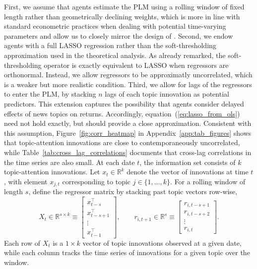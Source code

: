 \documentclass[11pt]{article}
\begin{document}
First, we assume that agents estimate the PLM using a rolling window of fixed length rather than geometrically declining weights, which is more in line with standard econometric practices when dealing with potential time-varying parameters and allow us to closely mirror
the design of \cite{Chinco2019}.
Second, we endow agents with a full LASSO regression rather than the soft-thresholding approximation used in the theoretical analysis.
As already remarked, the soft-thresholding operator is exactly equivalent to LASSO when regressors are orthonormal.
Instead, we allow regressors to be approximatly uncorrelated, which is a weaker but more realistic condition.
Third, we allow for lags of the regressors to enter the PLM, by stacking $n$ lags of each topic innovation as potential predictors.
This extension captures the possibility that agents consider delayed effects of news topics on returns.
Accordingly, equation~(\ref{eq:lasso_from_ols}) need not hold exactly, but should provide a close approximation.
Consistent with this assumption, Figure~\ref{fig:corr_heatmap} in Appendix~\ref{app:tab_figures} shows that topic-attention innovations are close to contemporaneously uncorrelated, while Table~\ref{tab:cross_lag_correlations} documents that cross-lag correlations in the time series are also small.
At each date \(t\), the information set consists of \(k\) topic-attention innovations. Let
\(x_t \in \mathbb{R}^{k}\) denote the vector of innovations at time \(t\), with element
\(x_{j,t}\) corresponding to topic \(j \in \{1,\ldots,k\}\).
For a rolling window of length \(s\), define the regressor matrix by stacking past topic
vectors row-wise,
\begin{equation}
X_t \in \mathbb{R}^{s \times k}
\equiv
\begin{bmatrix}
x_{t-s}^\top \\
x_{t-s+1}^\top \\
\vdots \\
x_{t-1}^\top
\end{bmatrix},
\qquad
r_{i,t+1} \in \mathbb{R}^{s}
\equiv
\begin{bmatrix}
r_{i,t-s+1} \\
r_{i,t-s+2} \\
\vdots \\
r_{i,t}
\end{bmatrix}.
\end{equation}
Each row of \(X_t\) is a \(1 \times k\) vector of topic innovations observed at a given date,
while each column tracks the time series of innovations for a given topic over the window.
\end{document}
